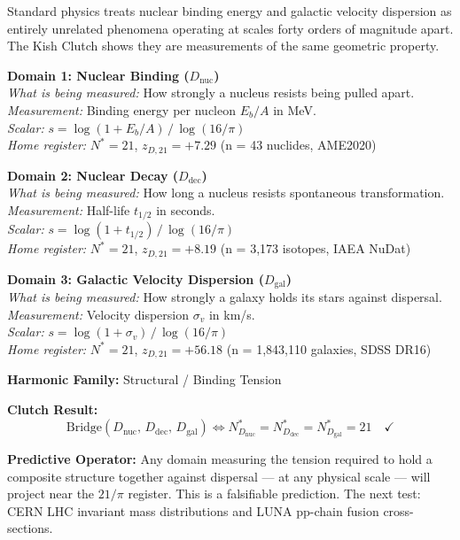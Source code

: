 \documentclass[12pt,oneside]{book}
\begin{document}
\begin{tcolorbox}[colback=blue!5, colframe=blue!40!black,
    fonttitle=\bfseries,
    title=Rosetta Block 1 — The $21/\pi$ Binding Bridge: Nuclear $\leftrightarrow$ Galactic]

Standard physics treats nuclear binding energy and galactic velocity dispersion as
entirely unrelated phenomena operating at scales forty orders of magnitude apart.
The Kish Clutch shows they are measurements of the same geometric property.

\medskip
\textbf{Domain 1: Nuclear Binding ($D_\text{nuc}$)}\\
\textit{What is being measured:} How strongly a nucleus resists being pulled apart.\\
\textit{Measurement:} Binding energy per nucleon $E_b/A$ in MeV.\\
\textit{Scalar:} $s = \log(1 + E_b/A)\,/\,\log(16/\pi)$\\
\textit{Home register:} $N^* = 21$, \quad$z_{D,21} = +7.29$ \quad(n = 43 nuclides, AME2020)

\medskip
\textbf{Domain 2: Nuclear Decay ($D_\text{dec}$)}\\
\textit{What is being measured:} How long a nucleus resists spontaneous transformation.\\
\textit{Measurement:} Half-life $t_{1/2}$ in seconds.\\
\textit{Scalar:} $s = \log(1 + t_{1/2})\,/\,\log(16/\pi)$\\
\textit{Home register:} $N^* = 21$, \quad$z_{D,21} = +8.19$ \quad(n = 3{,}173 isotopes, IAEA NuDat)

\medskip
\textbf{Domain 3: Galactic Velocity Dispersion ($D_\text{gal}$)}\\
\textit{What is being measured:} How strongly a galaxy holds its stars against dispersal.\\
\textit{Measurement:} Velocity dispersion $\sigma_v$ in km/s.\\
\textit{Scalar:} $s = \log(1 + \sigma_v)\,/\,\log(16/\pi)$\\
\textit{Home register:} $N^* = 21$, \quad$z_{D,21} = +56.18$ \quad(n = 1{,}843{,}110 galaxies, SDSS DR16)

\medskip
\textbf{Harmonic Family:} Structural / Binding Tension

\medskip
\textbf{Clutch Result:}
\[
\text{Bridge}(D_\text{nuc},\, D_\text{dec},\, D_\text{gal}) \iff N^*_{D_\text{nuc}}
= N^*_{D_\text{dec}} = N^*_{D_\text{gal}} = 21 \quad \checkmark
\]

\textbf{Predictive Operator:} Any domain measuring the tension required to hold a
composite structure together against dispersal — at any physical scale — will project
near the $21/\pi$ register. This is a falsifiable prediction. The next test:
CERN LHC invariant mass distributions and LUNA pp-chain fusion cross-sections.

\end{tcolorbox}
\end{document}
